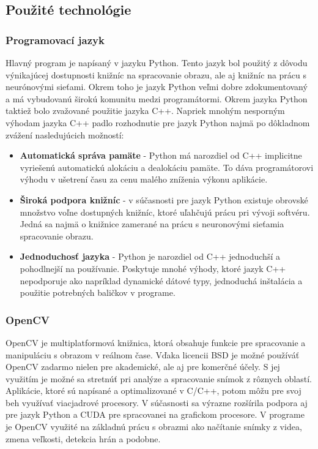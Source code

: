 \documentclass[slovak,master,dept460,male,cpp,cpdeclaration]{diploma}
\begin{document}
\newpage
\subsection{Použité technológie}

\subsubsection*{Programovací jazyk}
Hlavný program je napísaný v jazyku Python. Tento jazyk bol použitý z dôvodu výnikajúcej dostupnosti knižníc na spracovanie obrazu, ale aj knižníc na prácu s neurónovými sieťami. Okrem toho je jazyk Python veľmi dobre zdokumentovaný a má vybudovanú širokú komunitu medzi programátormi. Okrem jazyka Python taktiež bolo zvažované použitie jazyka C++.  Napriek mnohým nesporným výhodam jazyka C++ padlo rozhodnutie pre jazyk Python najmä po dôkladnom zvážení nasledujúcich možností:
\begin{itemize}
\item \textbf{Automatická správa pamäte} - Python má narozdiel od C++  implicitne  vyriešenú automatickú alokáciu a dealokáciu pamäte. To dáva programátorovi výhodu v ušetrení času za cenu malého zníženia výkonu aplikácie.
\item \textbf{Široká podpora knižníc} - v súčasnosti pre jazyk Python existuje obrovské množstvo voľne dostupných knižníc, ktoré uľahčujú prácu pri vývoji softvéru. Jedná sa najmä o knižnice zamerané na prácu s neuronovými sieťamia spracovanie obrazu.
\item \textbf{Jednoduchosť jazyka} - Python je narozdiel od C++ jednoduchší a pohodlnejší  na používanie. Poskytuje mnohé výhody, ktoré jazyk C++ nepodporuje ako napríklad dynamické dátové typy, jednoduchá inštalácia a použitie potrebných baličkov v programe.
\end{itemize}

\subsubsection*{OpenCV}
OpenCV je multiplatformová knižnica, ktorá obsahuje funkcie pre spracovanie a manipuláciu s obrazom v reálnom čase. Vďaka licencii BSD je možné používáť OpenCV zadarmo  nielen pre akademické, ale aj pre komerčné účely. S jej využitím je možné sa stretnúť pri analýze a spracovanie snímok z rôznych oblastí. Aplikácie, ktoré sú napísané a optimalizované v C/C++, potom môžu pre svoj beh využívať viacjadrové procesory. V súčasnosti sa výrazne rozšírila podpora aj pre jazyk Python a CUDA pre spracovanei na grafickom procesore. V programe je OpenCV využité  na základnú prácu s obrazmi ako načítanie snímky z videa, zmena veľkosti, detekcia hrán a podobne.
\end{document}
